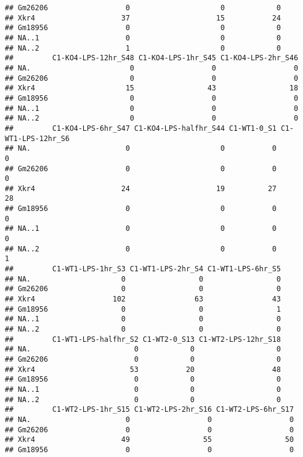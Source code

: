 \documentclass[
]{article}
\begin{document}
\begin{verbatim}
## Gm26206                  0                     0            0
## Xkr4                    37                    15           24
## Gm18956                  0                     0            0
## NA..1                    0                     0            0
## NA..2                    1                     0            0
##         C1-KO4-LPS-12hr_S48 C1-KO4-LPS-1hr_S45 C1-KO4-LPS-2hr_S46
## NA.                       0                  0                  0
## Gm26206                   0                  0                  0
## Xkr4                     15                 43                 18
## Gm18956                   0                  0                  0
## NA..1                     0                  0                  0
## NA..2                     0                  0                  0
##         C1-KO4-LPS-6hr_S47 C1-KO4-LPS-halfhr_S44 C1-WT1-0_S1 C1-WT1-LPS-12hr_S6
## NA.                      0                     0           0                  0
## Gm26206                  0                     0           0                  0
## Xkr4                    24                    19          27                 28
## Gm18956                  0                     0           0                  0
## NA..1                    0                     0           0                  0
## NA..2                    0                     0           0                  1
##         C1-WT1-LPS-1hr_S3 C1-WT1-LPS-2hr_S4 C1-WT1-LPS-6hr_S5
## NA.                     0                 0                 0
## Gm26206                 0                 0                 0
## Xkr4                  102                63                43
## Gm18956                 0                 0                 1
## NA..1                   0                 0                 0
## NA..2                   0                 0                 0
##         C1-WT1-LPS-halfhr_S2 C1-WT2-0_S13 C1-WT2-LPS-12hr_S18
## NA.                        0            0                   0
## Gm26206                    0            0                   0
## Xkr4                      53           20                  48
## Gm18956                    0            0                   0
## NA..1                      0            0                   0
## NA..2                      0            0                   0
##         C1-WT2-LPS-1hr_S15 C1-WT2-LPS-2hr_S16 C1-WT2-LPS-6hr_S17
## NA.                      0                  0                  0
## Gm26206                  0                  0                  0
## Xkr4                    49                 55                 50
## Gm18956                  0                  0                  0

\end{verbatim}
\end{document}
